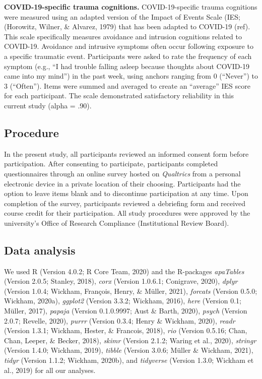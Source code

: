 \documentclass[
  english,
  man, noextraspace]{apa6}
\begin{document}
\textbf{COVID-19-specific trauma cognitions.} COVID-19-specific trauma cognitions were measured using an adapted version of the Impact of Events Scale (IES; (Horowitz, Wilner, \& Alvarez, 1979) that has been adapted to COVID-19 (ref). This scale specifically measures avoidance and intrusion cognitions related to COVID-19. Avoidance and intrusive symptoms often occur following exposure to a specific traumatic event. Participants were asked to rate the frequency of each symptom (e.g., \enquote{I had trouble falling asleep because thoughts about COVID-19 came into my mind}) in the past week, using anchors ranging from 0 (\enquote{Never}) to 3 (\enquote{Often}). Items were summed and averaged to create an \enquote{average} IES score for each participant. The scale demonstrated satisfactory reliability in this current study (alpha = .90).

\hypertarget{procedure}{%
\subsection{Procedure}\label{procedure}}

In the present study, all participants reviewed an informed consent form before participation. After consenting to participate, participants completed questionnaires through an online survey hosted on \emph{Qualtrics} from a personal electronic device in a private location of their choosing. Participants had the option to leave items blank and to discontinue participation at any time. Upon completion of the survey, participants reviewed a debriefing form and received course credit for their participation. All study procedures were approved by the university's Office of Research Compliance (Institutional Review Board).

\hypertarget{data-analysis}{%
\subsection{Data analysis}\label{data-analysis}}

We used R (Version 4.0.2; R Core Team, 2020) and the R-packages \emph{apaTables} (Version 2.0.5; Stanley, 2018), \emph{corx} (Version 1.0.6.1; Conigrave, 2020), \emph{dplyr} (Version 1.0.4; Wickham, François, Henry, \& Müller, 2021), \emph{forcats} (Version 0.5.0; Wickham, 2020a), \emph{ggplot2} (Version 3.3.2; Wickham, 2016), \emph{here} (Version 0.1; Müller, 2017), \emph{papaja} (Version 0.1.0.9997; Aust \& Barth, 2020), \emph{psych} (Version 2.0.7; Revelle, 2020), \emph{purrr} (Version 0.3.4; Henry \& Wickham, 2020), \emph{readr} (Version 1.3.1; Wickham, Hester, \& Francois, 2018), \emph{rio} (Version 0.5.16; Chan, Chan, Leeper, \& Becker, 2018), \emph{skimr} (Version 2.1.2; Waring et al., 2020), \emph{stringr} (Version 1.4.0; Wickham, 2019), \emph{tibble} (Version 3.0.6; Müller \& Wickham, 2021), \emph{tidyr} (Version 1.1.2; Wickham, 2020b), and \emph{tidyverse} (Version 1.3.0; Wickham et al., 2019) for all our analyses.
\end{document}
